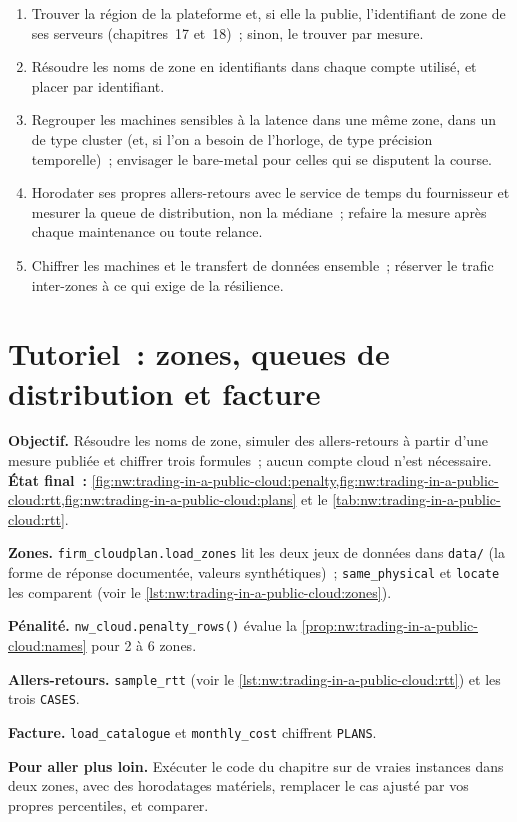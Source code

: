 \begin{method}\label{met:nw:trading-in-a-public-cloud:place}
\begin{enumerate}
\item Trouver la région de la plateforme et, si elle la publie, l'identifiant de zone de ses serveurs (chapitres~17 et~18)~; sinon, le trouver par mesure.
\item Résoudre les noms de zone en identifiants dans chaque compte utilisé, et placer par identifiant.
\item Regrouper les machines sensibles à la latence dans une même zone, dans un  de type cluster (et, si l'on a besoin de l'horloge, de type précision temporelle)~; envisager le
  bare-metal pour celles qui se disputent la course.
\item Horodater ses propres allers-retours avec le service de temps du fournisseur et mesurer la queue de distribution, non la médiane~; refaire la mesure après chaque maintenance
  ou toute relance.
\item Chiffrer les machines et le transfert de données ensemble~; réserver le trafic inter-zones à ce qui exige de la résilience.
\end{enumerate}
\end{method}

\section{Tutoriel~: zones, queues de distribution et facture}\label{tut:nw:trading-in-a-public-cloud:tut}

\begin{tutorial}
\textbf{Objectif.} Résoudre les noms de zone, simuler des allers-retours à partir d'une mesure publiée et chiffrer trois formules~; aucun compte cloud n'est nécessaire.
\textbf{État final~:} \cref{fig:nw:trading-in-a-public-cloud:penalty,fig:nw:trading-in-a-public-cloud:rtt,fig:nw:trading-in-a-public-cloud:plans}
et le \cref{tab:nw:trading-in-a-public-cloud:rtt}.
\begin{tutsteps}
\item \textbf{Zones.} \texttt{firm\_cloudplan.load\_zones} lit les deux jeux de données dans \texttt{data/} (la forme de réponse documentée, valeurs
  synthétiques)~; \texttt{same\_physical} et \texttt{locate} les comparent (voir le \cref{lst:nw:trading-in-a-public-cloud:zones}).
\item \textbf{Pénalité.} \texttt{nw\_cloud.penalty\_rows()} évalue la \cref{prop:nw:trading-in-a-public-cloud:names} pour 2 à 6 zones.
\item \textbf{Allers-retours.} \texttt{sample\_rtt} (voir le \cref{lst:nw:trading-in-a-public-cloud:rtt}) et les trois \texttt{CASES}.
\item \textbf{Facture.} \texttt{load\_catalogue} et \texttt{monthly\_cost} chiffrent \texttt{PLANS}.
\end{tutsteps}
\textbf{Pour aller plus loin.} Exécuter le code du chapitre sur de vraies instances dans deux zones, avec des horodatages matériels, remplacer le cas ajusté
par vos propres percentiles, et comparer.
\end{tutorial}

